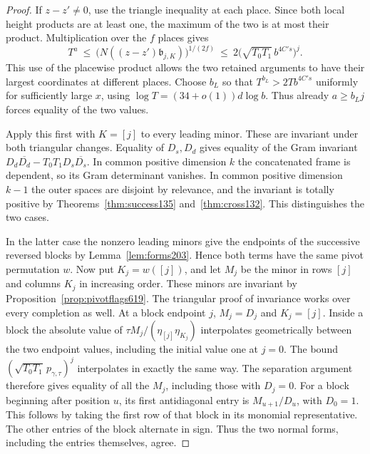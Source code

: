 \documentclass[a4paper,11pt]{article}
\theoremstyle{definition}
\theoremstyle{remark}
\numberwithin{equation}{section}
\begin{document}
\begin{proof}
If \(z-z'\ne0\), use the triangle inequality at each place.
Since both local height products are at least one, the
maximum of the two is at most their product. Multiplication
over the \(f\) places gives
\[
 T^a\ \le\ \bigl(N((z-z')\mathfrak b_{j,K})\bigr)^{1/(2f)}
       \ \le\ 2\bigl(\sqrt{T_0T_1}\,b^{4C's}\bigr)^j .
\]
This use of the placewise product allows the two retained
arguments to have their largest coordinates at different places.
Choose \(b_L\) so that \(T^{b_L}>2T b^{4C's}\) uniformly for
sufficiently large \(x\), using
\(\log T=(34+o(1))d\log b\). Thus already \(a\ge b_L j\)
forces equality of the two values.

Apply this first with \(K=[j]\) to every leading minor.
These are invariant under both triangular changes. Equality
of \(D_s,D_d\) gives equality of the Gram invariant
\(D_d\overline{D_d}-T_0T_1D_s\overline{D_s}\).
In common positive dimension \(k\) the concatenated frame is
dependent, so its Gram determinant vanishes. In common positive
dimension \(k-1\) the outer spaces are disjoint by relevance,
and the invariant is totally positive by
Theorems~\ref{thm:success135} and~\ref{thm:cross132}. This
distinguishes the two cases.

In the latter case the nonzero leading minors give the endpoints
of the successive reversed blocks by Lemma~\ref{lem:forms203}.
Hence both terms have the same pivot permutation \(w\).
Now put \(K_j=w([j])\), and let \(M_j\) be the minor in rows
\([j]\) and columns \(K_j\) in increasing order. These minors
are invariant by Proposition~\ref{prop:pivotflags619}. The
triangular proof of invariance works over every completion as
well. At a block endpoint \(j\), \(M_j=D_j\) and \(K_j=[j]\).
Inside a block the absolute value of
\(\tau M_j/(\eta_{[j]}\eta_{K_j})\) interpolates geometrically
between the two endpoint values, including the initial value
one at \(j=0\). The bound
\((\sqrt{T_0T_1}\,p_{\gamma,\tau})^j\) interpolates in exactly
the same way. The separation argument therefore gives equality
of all the \(M_j\), including those with \(D_j=0\). For a block
beginning after position \(u\), its first antidiagonal entry is
\(M_{u+1}/D_u\), with \(D_0=1\). This follows by taking the
first row of that block in its monomial representative. The
other entries of the block alternate in sign. Thus the two
normal forms, including the entries themselves, agree.
\end{proof}
\end{document}
